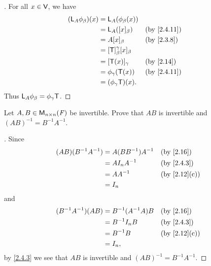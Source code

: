 \begin{proof}[]
	For all \(x \in \mathsf{V}\), we have
	\begin{align*}
		(\L_A \phi_{\beta})(x) & = \L_A(\phi_{\beta}(x))                              \\
		                       & = \L_A([x]_{\beta})                 &  & \by{2.4.11} \\
		                       & = A [x]_{\beta}                     &  & \by{2.3.8}  \\
		                       & = [\T]_{\beta}^{\gamma} [x]_{\beta}                  \\
		                       & = [\T(x)]_{\gamma}                  &  & \by{2.14}   \\
		                       & = \phi_{\gamma}(\T(x))              &  & \by{2.4.11} \\
		                       & = (\phi_{\gamma} \T)(x).
	\end{align*}
	Thus \(\mathsf{L}_A \phi_{\beta} = \phi_{\gamma} \mathsf{T}\).
\end{proof}

\exercisesection

\setcounter{ex}{3}
\begin{ex}\label{ex:2.4.4}
	Let \(A, B \in \ms[n][n][\F]\) be invertible.
	Prove that \(AB\) is invertible and \((AB)^{-1} = B^{-1} A^{-1}\).
\end{ex}

\begin{proof}[]
	Since
	\begin{align*}
		(AB) (B^{-1} A^{-1}) & = A (B B^{-1}) A^{-1} &  & \by{2.16}    \\
		                     & = A I_n A^{-1}        &  & \by{2.4.3}   \\
		                     & = A A^{-1}            &  & \by{2.12}[c] \\
		                     & = I_n
	\end{align*}
	and
	\begin{align*}
		(B^{-1} A^{-1}) (AB) & = B^{-1} (A^{-1} A) B &  & \by{2.16}    \\
		                     & = B^{-1} I_n B        &  & \by{2.4.3}   \\
		                     & = B^{-1} B            &  & \by{2.12}[c] \\
		                     & = I_n,
	\end{align*}
	by \cref{2.4.3} we see that \(AB\) is invertible and \((AB)^{-1} = B^{-1} A^{-1}\).
\end{proof}

